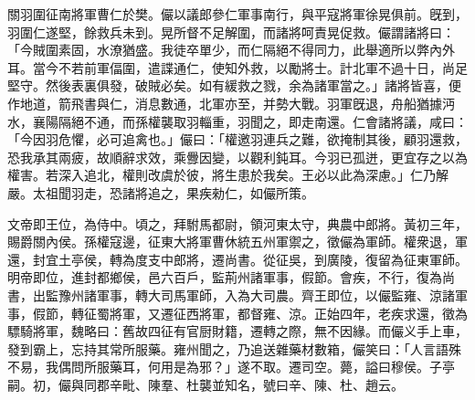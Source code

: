 \begin{pinyinscope}
關羽圍征南將軍曹仁於樊。儼以議郎參仁軍事南行，與平寇將軍徐晃俱前。旣到，羽圍仁遂堅，餘救兵未到。晃所督不足解圍，而諸將呵責晃促救。儼謂諸將曰：「今賊圍素固，水潦猶盛。我徒卒單少，而仁隔絕不得同力，此舉適所以弊內外耳。當今不若前軍偪圍，遣諜通仁，使知外救，以勵將士。計北軍不過十日，尚足堅守。然後表裏俱發，破賊必矣。如有緩救之戮，余為諸軍當之。」諸將皆喜，便作地道，箭飛書與仁，消息數通，北軍亦至，并勢大戰。羽軍旣退，舟船猶據沔水，襄陽隔絕不通，而孫權襲取羽輜重，羽聞之，即走南還。仁會諸將議，咸曰：「今因羽危懼，必可追禽也。」儼曰：「權邀羽連兵之難，欲掩制其後，顧羽還救，恐我承其兩疲，故順辭求效，乘釁因變，以觀利鈍耳。今羽已孤迸，更宜存之以為權害。若深入追北，權則改虞於彼，將生患於我矣。王必以此為深慮。」仁乃解嚴。太祖聞羽走，恐諸將追之，果疾勑仁，如儼所策。

文帝即王位，為侍中。頃之，拜駙馬都尉，領河東太守，典農中郎將。黃初三年，賜爵關內侯。孫權寇邊，征東大將軍曹休統五州軍禦之，徵儼為軍師。權衆退，軍還，封宜土亭侯，轉為度支中郎將，遷尚書。從征吳，到廣陵，復留為征東軍師。明帝即位，進封都鄉侯，邑六百戶，監荊州諸軍事，假節。會疾，不行，復為尚書，出監豫州諸軍事，轉大司馬軍師，入為大司農。齊王即位，以儼監雍、涼諸軍事，假節，轉征蜀將軍，又遷征西將軍，都督雍、涼。正始四年，老疾求還，徵為驃騎將軍，魏略曰：舊故四征有官厨財籍，遷轉之際，無不因緣。而儼义手上車，發到霸上，忘持其常所服藥。雍州聞之，乃追送雜藥材數箱，儼笑曰：「人言語殊不易，我偶問所服藥耳，何用是為邪？」遂不取。遷司空。薨，謚曰穆侯。子亭嗣。初，儼與同郡辛毗、陳羣、杜襲並知名，號曰辛、陳、杜、趙云。


\end{pinyinscope}